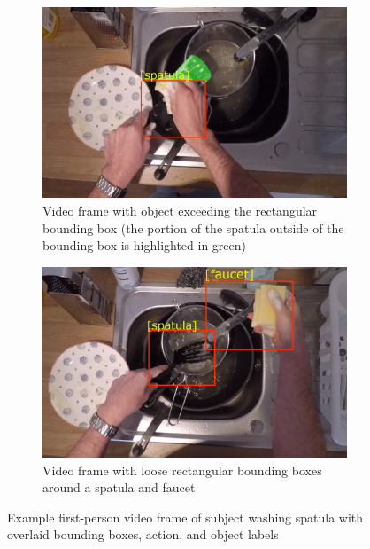 \documentclass[12pt]{report}
\begin{document}
\begin{figure}[t]
\begin{subfigure}{.5\textwidth}
\centerline{\includegraphics[width=.95\textwidth]{figure/frame_4527_cropped.png}}
\caption{Video frame with object exceeding the rectangular bounding box (the portion of the spatula outside of the bounding box is highlighted in green)}
\label{sampleA}
\end{subfigure}
\begin{subfigure}{.5\textwidth}
\centerline{\includegraphics[width=.95\textwidth]{figure/frame_4085_cropped.png}}
\caption{Video frame with loose rectangular bounding boxes around a spatula and faucet \\ }
\label{sampleB}
\end{subfigure}
\caption{Example first-person video frame of subject washing spatula with overlaid bounding boxes, action, and object labels}
\label{sampleFrame}
\end{figure}
\end{document}
